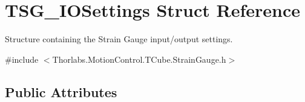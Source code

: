 \hypertarget{struct_t_s_g___i_o_settings}{}\section{T\+S\+G\+\_\+\+I\+O\+Settings Struct Reference}
\label{struct_t_s_g___i_o_settings}


Structure containing the Strain Gauge input/output settings.  




{\ttfamily \#include $<$Thorlabs.\+Motion\+Control.\+T\+Cube.\+Strain\+Gauge.\+h$>$}

\subsection*{Public Attributes}

